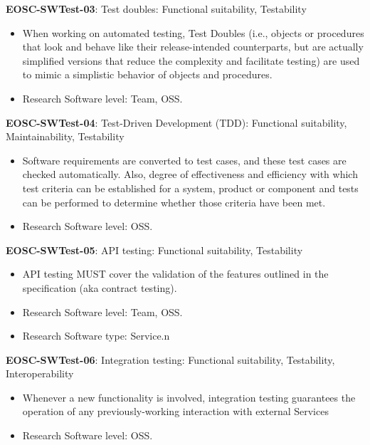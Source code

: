 \textbf{EOSC-SWTest-03}: Test doubles: Functional suitability, Testability

\begin{itemize}
    \item When working on automated testing,  Test Doubles (i.e., objects or procedures that look and behave like their release-intended 
counterparts, but are actually simplified versions that reduce the 
complexity and facilitate testing) are used to mimic a simplistic behavior of objects and procedures. \cite{orviz_set_2017,orviz_fernandez_eosc-synergy_2020}
    \item Research Software level: Team, OSS.
\end{itemize}

\textbf{EOSC-SWTest-04}: Test-Driven Development (TDD): Functional suitability, Maintainability, Testability

\begin{itemize}
    \item Software requirements are converted to test cases, and these test cases are checked automatically. Also, degree of effectiveness and efficiency with which test criteria can be established for a system, product or
component and tests can be performed to determine whether those criteria have been met. \cite{iso_25010_2011_2017,crispin_driving_2006,zuser_software_2005,orviz_set_2017}
    \item Research Software level: OSS.
\end{itemize}

\textbf{EOSC-SWTest-05}: API testing: Functional suitability, Testability

\begin{itemize}
    \item API testing MUST cover the validation of the features outlined in the specification (aka contract testing). \cite{orviz_fernandez_eosc-synergy_2020}
    \item Research Software level: Team, OSS.
    \item Research Software type: Service.n\end{itemize}

\textbf{EOSC-SWTest-06}: Integration testing: Functional suitability, Testability, Interoperability

\begin{itemize}
    \item Whenever a new functionality is involved, integration testing guarantees the operation of any previously-working interaction with external Services \cite{iso_25010_2011_2017,orviz_fernandez_eosc-synergy_2020}
    \item Research Software level: OSS.
\end{itemize}

